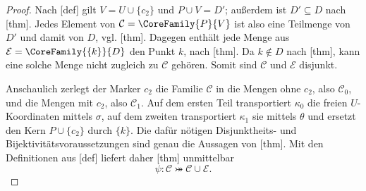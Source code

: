 \documentclass[main.tex]{subfiles}
\begin{document}
\pagebreak[2]
\begin{proof}
Nach [def] gilt
\(V=U\cup\{c_2\}\) und \(P\cup V=D'\); außerdem ist
\(D'\subseteq D\) nach
[thm]. Jedes Element von
\(\mathcal C=\CoreFamily{P}{V}\) ist also eine Teilmenge von \(D'\) und
damit von \(D\), vgl.
[thm]. Dagegen enthält jede
Menge aus \(\mathcal E=\CoreFamily{\{k\}}{D}\) den Punkt \(k\), nach
[thm]. Da \(k\notin D\) nach
[thm], kann
eine solche Menge nicht zugleich zu \(\mathcal C\) gehören. Somit sind
\(\mathcal C\) und \(\mathcal E\) disjunkt.

Anschaulich zerlegt der Marker \(c_2\) die Familie \(\mathcal C\) in
die Mengen ohne \(c_2\), also \(\mathcal C_0\), und die Mengen mit
\(c_2\), also \(\mathcal C_1\). Auf dem ersten Teil transportiert
\(\kappa_0\) die freien \(U\)-Koordinaten mittels \(\sigma\), auf dem
zweiten transportiert \(\kappa_1\) sie mittels \(\theta\) und ersetzt
den Kern \(P\cup\{c_2\}\) durch \(\{k\}\). Die dafür nötigen
Disjunktheits- und Bijektivitätsvoraussetzungen sind genau die Aussagen
von [thm].
Mit den Definitionen aus
[def] liefert daher
[thm] unmittelbar
\[
  \psi\colon\mathcal C\bij\mathcal C\cup\mathcal E.
\]
\end{proof}
\end{document}
